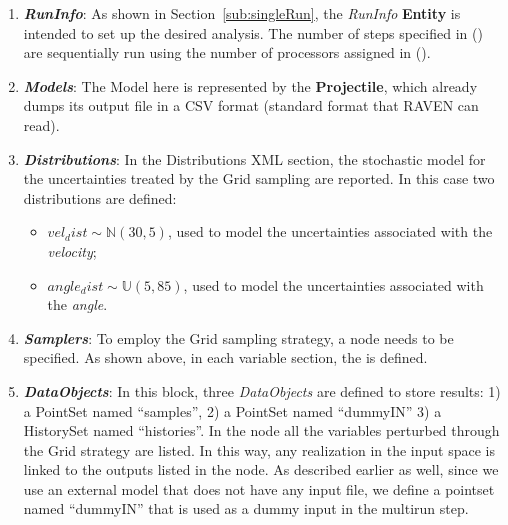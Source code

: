 \begin{enumerate}
   \item \textbf{\textit{RunInfo}}:
   As shown in Section~\ref{sub:singleRun}, the \textit{RunInfo} \textbf{Entity} is intended to set up the desired analysis. The number of steps specified in () are sequentially run using the number of processors assigned in (). 
   \item \textbf{\textit{Models}}:
 The Model here is represented by the \textbf{Projectile}, which already dumps its output file in a
 CSV format (standard format that RAVEN can read). 
   \item \textbf{\textit{Distributions}}:
  In the Distributions XML section, the stochastic model for the
  uncertainties  treated by the Grid sampling are reported. In
  this case two distributions are defined:
  \begin{itemize}
    \item $vel_dist \sim \mathbb{N}(30,5)$, used to model the uncertainties
    associated with  the \textit{velocity};
    \item  $angle_dist \sim \mathbb{U}(5,85)$,  used to
    model the uncertainties associated with the \textit{angle}.
  \end{itemize}
   \item \textbf{\textit{Samplers}}:
  To employ the Grid sampling strategy, a
   node needs to be specified. As shown above, in each variable section, the   is defined.
   \item \textbf{\textit{DataObjects}}:
  In this block, three \textit{DataObjects} are defined to store results: 1) a PointSet named
      ``samples'', 2) a PointSet named ``dummyIN'' 3) a HistorySet named ``histories''.
  In the  node all the variables  perturbed through the Grid strategy are listed. In this way, any  realization in the input space is linked to the outputs listed in  the
   node. As described earlier as well, since we use an external model that does not have any input file, we define a pointset named ``dummyIN'' that is used as a dummy input in the multirun step.

\end{enumerate}
